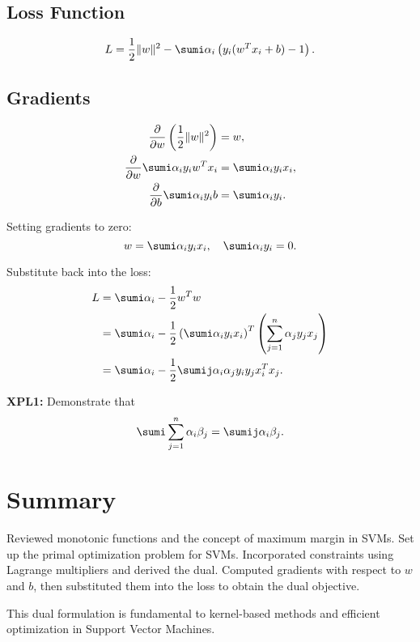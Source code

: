 \subsection{Loss Function}
\[
L = \frac{1}{2}\|w\|^2 - \sumi \alpha_i \left( y_i (w^T x_i + b) - 1 \right).
\]

\subsection{Gradients}
\begin{align}
    \frac{\partial}{\partial w} \left( \frac{1}{2}\|w\|^2 \right) &= w, \\
    \frac{\partial}{\partial w} \sumi \alpha_i y_i w^T x_i &= \sumi \alpha_i y_i x_i, \\
    \frac{\partial}{\partial b} \sumi \alpha_i y_i b &= \sumi \alpha_i y_i.
\end{align}

Setting gradients to zero:
\[
w = \sumi \alpha_i y_i x_i, \quad \sumi \alpha_i y_i = 0.
\]

Substitute back into the loss:
\begin{align}
    L &= \sumi \alpha_i - \frac{1}{2} w^T w \\
      &= \sumi \alpha_i - \frac{1}{2} \left( \sumi \alpha_i y_i x_i \right)^T \left( \sum_{j=1}^n \alpha_j y_j x_j \right) \\
      &= \sumi \alpha_i - \frac{1}{2} \sumij \alpha_i \alpha_j y_i y_j x_i^T x_j.
\end{align}

\begin{tcolorbox}
\textbf{XPL1:} Demonstrate that 
\[
\sumi \sum_{j=1}^n \alpha_i \beta_j = \sumij \alpha_i \beta_j.
\]
\end{tcolorbox}

\section{Summary}
\begin{outline}
    \1 Reviewed monotonic functions and the concept of maximum margin in SVMs.
    \1 Set up the primal optimization problem for SVMs.
    \1 Incorporated constraints using Lagrange multipliers and derived the dual.
    \1 Computed gradients with respect to \( w \) and \( b \), then substituted them into the loss to obtain the dual objective.
\end{outline}

This dual formulation is fundamental to kernel-based methods and efficient optimization in Support Vector Machines.

 
 
